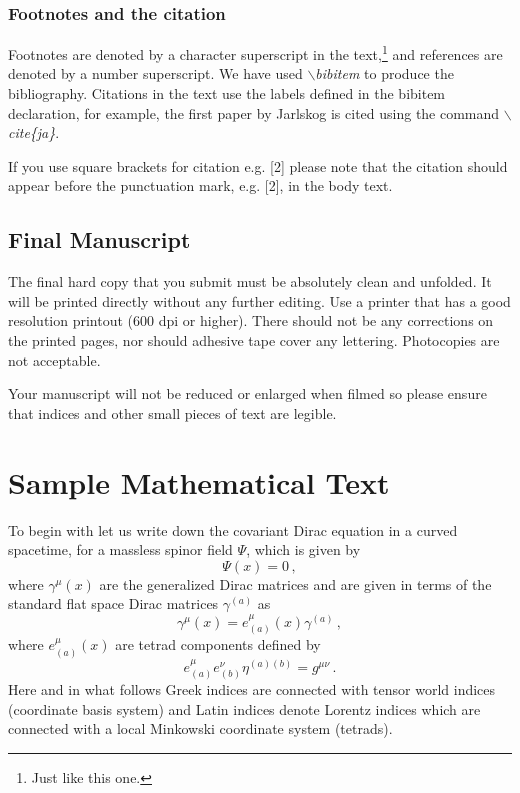\documentclass{ws-procs9x6}
\begin{document}
\subsubsection{Footnotes and the citation}
Footnotes are denoted by a character superscript
in the text,\footnote{Just like this one.} and references
are denoted by a number superscript.
We have used {\em $\backslash$bibitem} to produce the bibliography.
Citations in the text use the labels defined in the bibitem declaration,
for example, the first paper by Jarlskog\cite{ja} is cited using the command
{\em $\backslash$cite\{ja\}}.

If you use square brackets for citation e.g. [2] please note that  
the citation should appear before the punctuation mark, 
e.g. [2], in the body text. 

\subsection{Final Manuscript}
The final hard copy that you submit must be absolutely clean and unfolded.
It will be printed directly without any further editing. Use a printer
that has a good resolution printout (600 dpi or higher). There should
not be any corrections on the printed pages, nor should adhesive
tape cover any lettering. Photocopies are not acceptable.

Your manuscript will not be reduced or enlarged when filmed so please
ensure that indices and other small pieces of text are legible.

\section{Sample Mathematical Text}

To begin with let us write down the covariant Dirac equation in a
curved spacetime, for a massless spinor field $\Psi $, which is given
by
\begin{equation} 
[i\gamma^\mu(x)\partial_\mu+i\gamma^\mu(x)\Gamma_\mu(x)]\Psi(x)=0\,,
\label{eq:murn}
\end{equation}
where $\gamma^\mu(x)$ are the generalized Dirac matrices and are given
in terms of the standard flat space Dirac matrices $\gamma^{(a)}$ as
\begin{equation} 
\gamma^\mu(x)=e_{(a)}^\mu(x)\gamma^{(a)}\,,
\label{eq:sp}
\end{equation}
where $e_{(a)}^\mu(x)$ are tetrad components defined by
\begin{equation} 
e_{(a)}^\mu e_{(b)}^\nu\eta^{(a)(b)}=g^{\mu\nu}\,.
\label{eq:spa}
\end{equation}
Here and in what follows Greek indices are connected with tensor world
indices (coordinate basis system) and Latin indices denote Lorentz
indices which are connected with a local Minkowski coordinate system
(tetrads).
\end{document}
